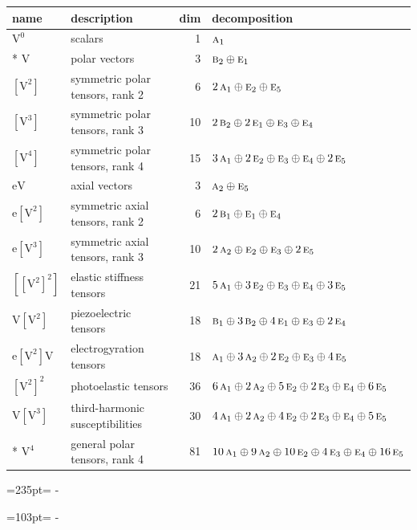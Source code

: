 \documentclass[10pt,a4paper]{article}
\newcommand{\needspace}[1]{\par\penalty-100\begingroup\dimen0=#1\relax\dimen2=\pagegoal
  \advance\dimen2-\pagetotal\ifdim\dimen0>\dimen2\relax\ifdim\dimen2>0pt\vfil\break\fi\fi
  \endgroup}
\numberwithin{equation}{section}
\newcommand{\irr}[1]{\text{\normalfont\scshape #1}}
\newcommand{\jahn}[1]{\mathrm{#1}}
\newlength{\fillwidth}\newlength{\cellwidth}\newlength{\colwidth}
\begin{document}
{\begin{longtable}{@{}llr>{\RaggedRight\arraybackslash}p{\fillwidth}@{}}
name & description & dim & decomposition\\\midrule\endhead
\bottomrule\endfoot\endlastfoot
$\jahn{V^{0}}$ & scalars & 1 & $\irr{a}_{1}$\\*
$\jahn{V}$ & polar vectors & 3 & $\irr{b}_{2} \oplus\allowbreak \irr{e}_{1}$\\
$\jahn{[V^{2}]}$ & symmetric polar tensors, rank 2 & 6 & $2\,\irr{a}_{1} \oplus\allowbreak \irr{e}_{2} \oplus\allowbreak \irr{e}_{5}$\\
$\jahn{[V^{3}]}$ & symmetric polar tensors, rank 3 & 10 & $2\,\irr{b}_{2} \oplus\allowbreak 2\,\irr{e}_{1} \oplus\allowbreak \irr{e}_{3} \oplus\allowbreak \irr{e}_{4}$\\
$\jahn{[V^{4}]}$ & symmetric polar tensors, rank 4 & 15 & $3\,\irr{a}_{1} \oplus\allowbreak 2\,\irr{e}_{2} \oplus\allowbreak \irr{e}_{3} \oplus\allowbreak \irr{e}_{4} \oplus\allowbreak 2\,\irr{e}_{5}$\\
$\jahn{eV}$ & axial vectors & 3 & $\irr{a}_{2} \oplus\allowbreak \irr{e}_{5}$\\
$\jahn{e[V^{2}]}$ & symmetric axial tensors, rank 2 & 6 & $2\,\irr{b}_{1} \oplus\allowbreak \irr{e}_{1} \oplus\allowbreak \irr{e}_{4}$\\
$\jahn{e[V^{3}]}$ & symmetric axial tensors, rank 3 & 10 & $2\,\irr{a}_{2} \oplus\allowbreak \irr{e}_{2} \oplus\allowbreak \irr{e}_{3} \oplus\allowbreak 2\,\irr{e}_{5}$\\
$\jahn{[[V^{2}]^{2}]}$ & elastic stiffness tensors & 21 & $5\,\irr{a}_{1} \oplus\allowbreak 3\,\irr{e}_{2} \oplus\allowbreak \irr{e}_{3} \oplus\allowbreak \irr{e}_{4} \oplus\allowbreak 3\,\irr{e}_{5}$\\
$\jahn{V[V^{2}]}$ & piezoelectric tensors & 18 & $\irr{b}_{1} \oplus\allowbreak 3\,\irr{b}_{2} \oplus\allowbreak 4\,\irr{e}_{1} \oplus\allowbreak \irr{e}_{3} \oplus\allowbreak 2\,\irr{e}_{4}$\\
$\jahn{e[V^{2}]V}$ & electrogyration tensors & 18 & $\irr{a}_{1} \oplus\allowbreak 3\,\irr{a}_{2} \oplus\allowbreak 2\,\irr{e}_{2} \oplus\allowbreak \irr{e}_{3} \oplus\allowbreak 4\,\irr{e}_{5}$\\
$\jahn{[V^{2}]^{2}}$ & photoelastic tensors & 36 & $6\,\irr{a}_{1} \oplus\allowbreak 2\,\irr{a}_{2} \oplus\allowbreak 5\,\irr{e}_{2} \oplus\allowbreak 2\,\irr{e}_{3} \oplus\allowbreak \irr{e}_{4} \oplus\allowbreak 6\,\irr{e}_{5}$\\
$\jahn{V[V^{3}]}$ & third-harmonic susceptibilities & 30 & $4\,\irr{a}_{1} \oplus\allowbreak 2\,\irr{a}_{2} \oplus\allowbreak 4\,\irr{e}_{2} \oplus\allowbreak 2\,\irr{e}_{3} \oplus\allowbreak \irr{e}_{4} \oplus\allowbreak 5\,\irr{e}_{5}$\\*
$\jahn{V^{4}}$ & general polar tensors, rank 4 & 81 & $10\,\irr{a}_{1} \oplus\allowbreak 9\,\irr{a}_{2} \oplus\allowbreak 10\,\irr{e}_{2} \oplus\allowbreak 4\,\irr{e}_{3} \oplus\allowbreak \irr{e}_{4} \oplus\allowbreak 16\,\irr{e}_{5}$\\
\bottomrule\end{longtable}}
\needspace{235pt}
\needspace{103pt}
\end{document}
